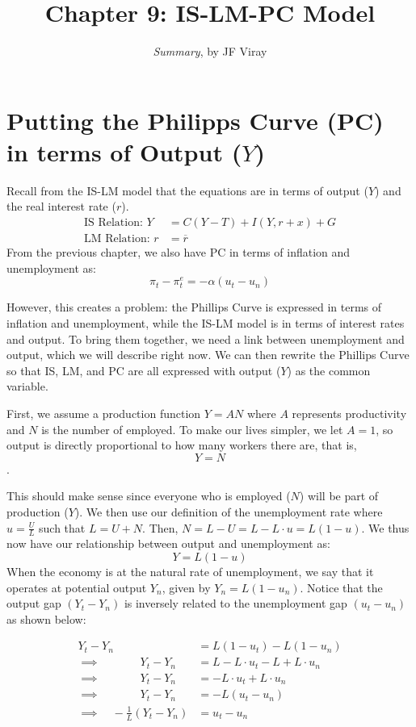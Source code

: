 \documentclass{extarticle}
\title{\vspace{-2em}Chapter 9: IS-LM-PC Model}
\author{\emph{Summary}, by JF Viray}
\date{}
\begin{document}
\maketitle

\section{Putting the Philipps Curve (PC) in terms of Output ($Y$)}
Recall from the IS-LM model that the equations are in terms of output ($Y$) and the real interest rate ($r$). 
\begin{align*}
  \text{IS Relation: } Y &= C(Y-T) + I(Y, r + x) + G \\
  \text{LM Relation: } r &= \overline{r}
\end{align*}
From the previous chapter, we also have PC in terms of inflation and unemployment as:
$$\pi_t - \pi^e_t = -\alpha (u_t- u_n)$$

However, this creates a problem: the Phillips Curve is expressed in terms of inflation and unemployment, while the IS-LM model is in terms of interest rates and output. 
To bring them together, we need a link between unemployment and output, which we will describe right now. 
We can then rewrite the Phillips Curve so that IS, LM, and PC are all expressed with output ($Y$) as the common variable.

First, we assume a production function $Y = AN$ where $A$ represents productivity and $N$ is the number of employed. To make our lives simpler, we let $A = 1$, so output is directly proportional to how many workers there are, that is, $$Y = N$$.

This should make sense since everyone who is employed ($N$) will be part of production ($Y$).
We then use our definition of the unemployment rate where $u = \frac{U}{L}$ such that $L = U + N$. Then, $N = L - U = L - L \cdot u =  L(1 - u)$. We thus now have our relationship between output and unemployment as:
$$Y = L(1-u)$$
When the economy is at the natural rate of unemployment, we say that it operates at potential output \(Y_n\), given by $ Y_n = L(1 - u_n).$ 
Notice that the output gap $(Y_t - Y_n)$ is inversely related to the unemployment gap \((u_t - u_n)\) as shown below:

\begin{align*}
    Y_t - Y_n &= L(1-u_t) - L(1-u_n) \\
    \implies \quad \quad \quad \; \: Y_t - Y_n &= L - L \cdot u_t - L + L \cdot u_n \\
    \implies \quad \quad \quad \; \: Y_t - Y_n &= - L \cdot u_t + L \cdot u_n \\
    \implies \quad \quad \quad \; \: Y_t - Y_n &= -L (u_t - u_n) \\
    \implies \quad -\frac{1}{L}(Y_t - Y_n) &= u_t - u_n
\end{align*}
\end{document}
